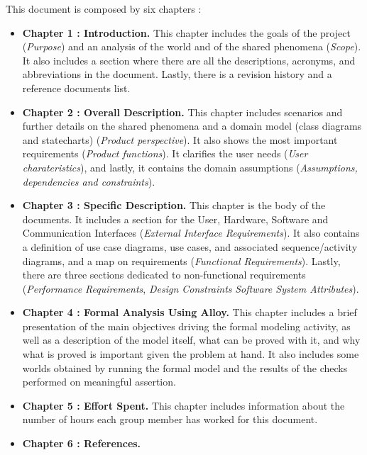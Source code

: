 This document is composed by six chapters :
\begin{itemize}
    \item \textbf{Chapter 1 : Introduction.} This chapter includes the goals of the project (\textit{Purpose}) 
    and an analysis of the world and of the shared phenomena (\textit{Scope}). It also includes a section where 
    there are all the descriptions, acronyms, and abbreviations in the document. Lastly, there 
    is a revision history and a reference documents list.
    \item \textbf{Chapter 2 : Overall Description.} This chapter includes scenarios and further
    details on the shared phenomena and a domain model (class diagrams and statecharts) (\textit{Product perspective}). It also
    shows the most important requirements (\textit{Product functions}). It clarifies the user needs (\textit{User charateristics}), and lastly, it contains 
    the domain assumptions (\textit{Assumptions, dependencies and constraints}).
    \item \textbf{Chapter 3 : Specific Description.} This chapter is the body of the documents. It includes a section for 
    the User, Hardware, Software and Communication Interfaces (\textit{External Interface Requirements}). It also contains a definition
    of use case diagrams, use cases, and associated sequence/activity diagrams, and a map on requirements (\textit{Functional Requirements}).
    Lastly, there are three sections dedicated to non-functional requirements (\textit{Performance Requirements}, \textit{Design Constraints} \textit{Software System Attributes}).
    \item \textbf{Chapter 4 : Formal Analysis Using Alloy.} This chapter includes a brief presentation of the
    main objectives driving the formal modeling activity, as well as a description of the model
    itself, what can be proved with it, and why what is proved is important given the problem at hand. It also includes some worlds obtained by running the
    formal model and the results of the checks performed on meaningful assertion.
    \item \textbf{Chapter 5 : Effort Spent.}  This chapter includes information about the number of hours each group member has worked for this document.    
    \item \textbf{Chapter 6 : References.}
\end{itemize}